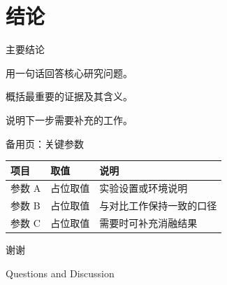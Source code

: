 \section{结论}

\begin{frame}{主要结论}
  \begin{keypoints}
    \item 用一句话回答核心研究问题。
    \item 概括最重要的证据及其含义。
    \item 说明下一步需要补充的工作。
  \end{keypoints}
\end{frame}

\begin{frame}{备用页：关键参数}
  \small
  \begin{tabularx}{\linewidth}{@{}lYY@{}}
    \toprule
    \textbf{项目} & \textbf{取值} & \textbf{说明} \\
    \midrule
    参数 A & 占位取值 & 实验设置或环境说明 \\
    参数 B & 占位取值 & 与对比工作保持一致的口径 \\
    参数 C & 占位取值 & 需要时可补充消融结果 \\
    \bottomrule
  \end{tabularx}
\end{frame}

\begin{frame}
  \centering
  \vfill
  { 谢谢}\par
  \vspace{0.8em}
  {\large Questions and Discussion}
  \vfill
\end{frame}

